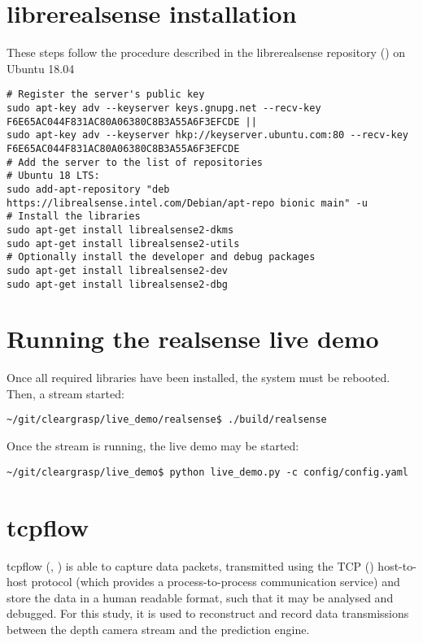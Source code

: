\section{librerealsense installation}
These steps follow the procedure described in the librerealsense repository (\cite{librealsense2021}) on Ubuntu 18.04
\begin{verbatim}
# Register the server's public key
sudo apt-key adv --keyserver keys.gnupg.net --recv-key F6E65AC044F831AC80A06380C8B3A55A6F3EFCDE ||
sudo apt-key adv --keyserver hkp://keyserver.ubuntu.com:80 --recv-key
F6E65AC044F831AC80A06380C8B3A55A6F3EFCDE 
# Add the server to the list of repositories
# Ubuntu 18 LTS:
sudo add-apt-repository "deb https://librealsense.intel.com/Debian/apt-repo bionic main" -u
# Install the libraries
sudo apt-get install librealsense2-dkms
sudo apt-get install librealsense2-utils
# Optionally install the developer and debug packages
sudo apt-get install librealsense2-dev
sudo apt-get install librealsense2-dbg
\end{verbatim}

\section{Running the realsense live demo}
Once all required libraries have been installed, the system must be rebooted. Then, a stream started:
\begin{verbatim}
~/git/cleargrasp/live_demo/realsense$ ./build/realsense    
\end{verbatim}
Once the stream is running, the live demo may be started:
\begin{verbatim}
~/git/cleargrasp/live_demo$ python live_demo.py -c config/config.yaml
\end{verbatim}

\section{tcpflow}
tcpflow (\cite{tcpflowElson2013}, \cite{garfinkel2013passive}) is able to capture data packets, transmitted using the TCP (\cite{rfc793}) host-to-host protocol (which provides a process-to-process communication service) and store the data in a human readable format, such that it may be analysed and debugged. For this study, it is used to reconstruct and record data transmissions between the depth camera stream and the prediction engine. 

